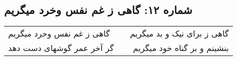 \begin{center}
\section*{شماره ۱۲: گاهی ز غم نفس وخرد میگریم}
\label{sec:012}
\begin{longtable}{l p{0.5cm} r}
گاهی ز غم نفس وخرد میگریم
&&
گاهی ز برای نیک و بد میگریم
\\
گر آخر عمر گوشهای دست دهد
&&
بنشینم و بر گناه خود میگریم
\\
\end{longtable}
\end{center}

